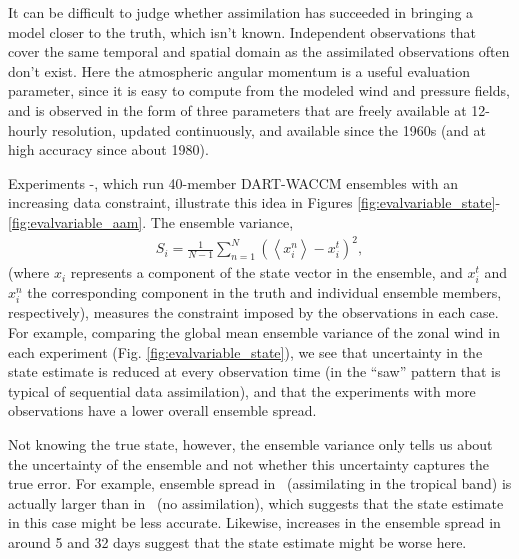 It can be difficult to judge whether assimilation has succeeded in bringing a model closer to the truth, which isn't known. 
Independent observations that cover the same temporal and spatial domain as the assimilated observations often don't exist. 
Here the atmospheric angular momentum is a useful evaluation parameter, since it is easy to compute from the modeled wind and pressure fields, and is observed in the form of three parameters that are freely available at 12-hourly resolution, updated continuously, and available since the 1960s (and at high accuracy since about 1980).  

Experiments \WACCMNODA-\WACCMGLOBAL, which run 40-member DART-WACCM ensembles with an increasing data constraint, illustrate this idea in Figures \ref{fig:evalvariable_state}-\ref{fig:evalvariable_aam}.   
The ensemble variance,
\begin{eqnarray}
S_i = 
\frac{1}{N-1}
\sum_{n=1}^N
\left(
	\left< x_{i}^{n} \right>-x_i^t
\right)^2,
\label{eq:spread}
\end{eqnarray}
(where $x_{i}$ represents a component of the state vector in the ensemble,  and $x_{i}^t$ and $x_{i}^n$ the corresponding component in the truth and individual ensemble members, respectively), measures the constraint imposed by the observations in each case.
For example, comparing the global mean ensemble variance of the zonal wind in each experiment (Fig. \ref{fig:evalvariable_state}), we see that uncertainty in the state estimate is reduced at every observation time (in the ``saw'' pattern that is typical of sequential data assimilation), and that the experiments with more observations have a lower overall ensemble spread. 

Not knowing the true state, however, the ensemble variance only tells us about the uncertainty of the ensemble and not whether this uncertainty captures the true error. 
For example, ensemble spread in \WACCMTROPICS~(assimilating in the tropical band) is actually larger than in \WACCMNODA~(no assimilation), which suggests that the state estimate in this case might be less accurate. 
Likewise, increases in the ensemble spread in \WACCMGLOBAL around 5 and 32 days suggest that the state estimate might be worse here. 



